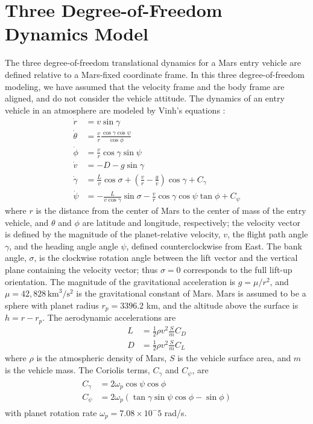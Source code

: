 \section{Three Degree-of-Freedom Dynamics Model}
The three degree-of-freedom translational dynamics for a Mars entry vehicle are defined relative to a Mars-fixed coordinate frame. In this three degree-of-freedom modeling, we have assumed that the velocity frame and the body frame are aligned, and do not consider the vehicle attitude.
The dynamics of an entry vehicle in an atmosphere are modeled by Vinh's equations \cite{VinhDyanmics}:
\begin{align}
	\dot{r} &= v\sin\gamma \label{Eq:dynamics:radius:time}\\
	\dot{\theta} &= \frac{v}{r}\frac{\cos\gamma\cos\psi}{\cos\phi} \\
	\dot{\phi} &= \frac{v}{r}\cos\gamma\sin\psi \\
	\dot{v} &= -D - g\sin\gamma \\ 
	\dot{\gamma} &= \frac{L}{v}\cos\sigma + \left(\frac{v}{r}-\frac{g}{v}\right)\cos\gamma + C_{\gamma}\\
	\dot{\psi} &= -\frac{L}{v\cos\gamma}\sin\sigma - \frac{v}{r}\cos\gamma\cos\psi\tan\phi + C_{\psi}\label{Eq:dynamics:heading:time}
\end{align}
where $r$ is the distance from the center of Mars to the center of mass of the entry vehicle, and $\theta$ and $\phi$ are latitude and longitude, respectively; the velocity vector is defined by the magnitude of the planet-relative velocity, $v$, the flight path angle $\gamma$, and the heading angle angle $\psi$, defined counterclockwise from East. The bank angle, $ \sigma $, is the clockwise rotation angle between the lift vector and the vertical plane containing the velocity vector; thus $\sigma=0$ corresponds to the full lift-up orientation. 
The magnitude of the gravitational acceleration is $g=\mu/r^2$, and $\mu=42,828\, \mathrm{km}^3/\mathrm{s}^2$ is the gravitational constant of Mars. Mars is assumed to be a sphere with planet radius $r_p=3396.2$ km, and the altitude above the surface is $h=r-r_p$. The aerodynamic accelerations are 
\begin{align}
		L &= \frac{1}{2}\rho v^2 \frac{S}{m}C_D \label{Eq:lift_accel}\\
		D &= \frac{1}{2}\rho v^2 \frac{S}{m}C_L \label{Eq:drag_accel}
\end{align}
where $\rho$ is the atmospheric density of Mars, $S$ is the vehicle surface area, and $m$ is the vehicle mass.  The Coriolis terms, $ C_{\gamma} $ and $ C_{\psi} $, are
\begin{align}
	\begin{split}
		C_{\gamma} &= 2\omega_p\cos\psi\cos\phi \\
		C_{\psi} &= 2\omega_p(\tan\gamma\sin\psi\cos\phi-\sin\phi)
	\end{split}
\end{align}
with planet rotation rate $\omega_p=7.08\times10^-5$ rad/s. 

